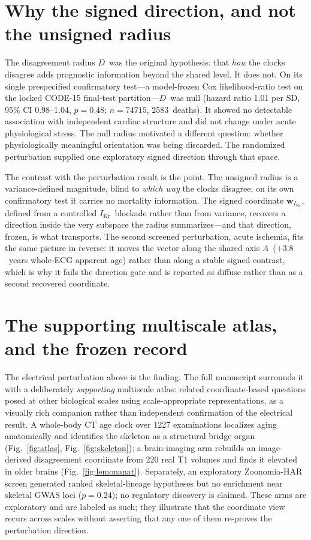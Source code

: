 \documentclass[10pt]{article}
\newcommand{\D}{\ensuremath{D}}
\newcommand{\A}{\ensuremath{A}}
\newcommand{\wikr}{\ensuremath{\mathbf{w}_{I_{\text{Kr}}}}}
\newcommand{\Ikr}{\ensuremath{I_{\text{Kr}}}}
\begin{document}
\section{Why the signed direction, and not the unsigned radius}
The disagreement radius \D\ was the original hypothesis: that \emph{how} the clocks disagree adds
prognostic information beyond the shared level. It does not. On its single prespecified
confirmatory test---a model-frozen Cox likelihood-ratio test on the locked CODE-15 final-test
partition---\D\ was null (hazard ratio \num{1.01} per SD, 95\% CI \numrange{0.98}{1.04},
$p=\num{0.48}$; $n=\num{74715}$, \num{2583}~deaths). It showed no detectable association with
independent cardiac structure and did not change under acute physiological stress.
The null radius motivated a different question: whether physiologically meaningful orientation
was being discarded. The randomized perturbation supplied one exploratory signed direction through
that space.

The contrast with the perturbation result is the point. The unsigned radius is a variance-defined
magnitude, blind to \emph{which way} the clocks disagree; on its own confirmatory test it carries
no mortality information. The signed coordinate \wikr, defined from a controlled \Ikr\ blockade
rather than from variance, recovers a direction inside the very subspace the radius summarizes---and
that direction, frozen, is what transports. The second screened perturbation, acute ischemia, fits
the same picture in reverse: it moves the vector along the shared axis \A\ ($+\num{3.8}$~years
whole-ECG apparent age) rather than along a stable signed contrast, which is why it fails the
direction gate and is reported as diffuse rather than as a second recovered coordinate.



\section{The supporting multiscale atlas, and the frozen record}
The electrical perturbation above is the finding. The full manuscript surrounds it with a
deliberately \emph{supporting} multiscale atlas: related coordinate-based questions posed at other
biological scales using scale-appropriate representations, as a visually rich companion rather than
independent confirmation of the electrical result. A whole-body CT age clock over \num{1227}
examinations localizes aging anatomically and identifies the skeleton as a structural bridge organ
(Fig.~\ref{fig:atlas}, Fig.~\ref{fig:skeleton}); a brain-imaging arm rebuilds an image-derived
disagreement coordinate from \num{220} real T1 volumes and finds it elevated in older brains
(Fig.~\ref{fig:lemonanat}). Separately, an exploratory Zoonomia-HAR screen generated ranked
skeletal-lineage hypotheses but no enrichment near skeletal GWAS loci ($p=\num{0.24}$); no
regulatory discovery is claimed. These arms are exploratory and are labeled as such; they
illustrate that the coordinate view recurs across scales without asserting that any one of them
re-proves the perturbation direction.
\end{document}
